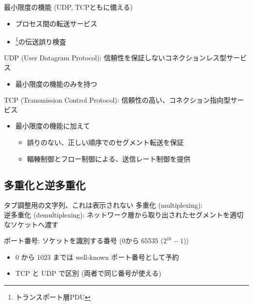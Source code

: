 最小限度の機能 (UDP, TCPともに備える)
\begin{itemize}
  \item プロセス間の転送サービス
  \item {}\footnote{
      トランスポート層PDU
    }の伝送誤り検査
\end{itemize}

UDP (User Datagram Protocol): 信頼性を保証しないコネクションレス型サービス
\begin{itemize}
  \item[] 最小限度の機能のみを持つ
\end{itemize}

TCP (Transmission Control Protocol): 信頼性の高い、コネクション指向型サービス
\begin{itemize}
  \item[] 最小限度の機能に加えて
  \begin{itemize}
    \item 誤りのない、正しい順序でのセグメント転送を保証
    \item 輻輳制御とフロー制御による、送信レート制御を提供
  \end{itemize}
\end{itemize}


\newpage
\subsection{多重化と逆多重化}
\begin{tabbing}
  タブ調整用の文字列、これは\=表示されない \kill
  多重化 (multiplexing): \>\\

  逆多重化 (demultiplexing): \>ネットワーク層から取り出されたセグメントを適切なソケットへ渡す
\end{tabbing}

ポート番号: ソケットを識別する番号 (0から 65535 ($2^{16}-1$))
\begin{itemize}
  \item 0 から 1023 までは well-known ポート番号として予約
  \item TCP と UDP で区別 (両者で同じ番号が使える)
\end{itemize}

